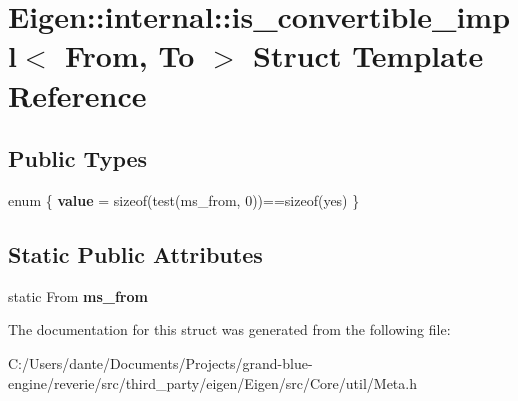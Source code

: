 \hypertarget{struct_eigen_1_1internal_1_1is__convertible__impl}{}\section{Eigen\+::internal\+::is\+\_\+convertible\+\_\+impl$<$ From, To $>$ Struct Template Reference}
\label{struct_eigen_1_1internal_1_1is__convertible__impl}
\subsection*{Public Types}
\begin{DoxyCompactItemize}
\item 
\mbox{\label{struct_eigen_1_1internal_1_1is__convertible__impl_a432491622458dd1d7c9f6b5535d4d65d}} 
enum \{ {\bfseries value} = sizeof(test(ms\+\_\+from, 0))==sizeof(yes)
 \}
\end{DoxyCompactItemize}
\subsection*{Static Public Attributes}
\begin{DoxyCompactItemize}
\item 
\mbox{\label{struct_eigen_1_1internal_1_1is__convertible__impl_a71015a88adaf071eee6e6fad4ee44662}} 
static From {\bfseries ms\+\_\+from}
\end{DoxyCompactItemize}


The documentation for this struct was generated from the following file\+:\begin{DoxyCompactItemize}
\item 
C\+:/\+Users/dante/\+Documents/\+Projects/grand-\/blue-\/engine/reverie/src/third\+\_\+party/eigen/\+Eigen/src/\+Core/util/Meta.\+h\end{DoxyCompactItemize}
